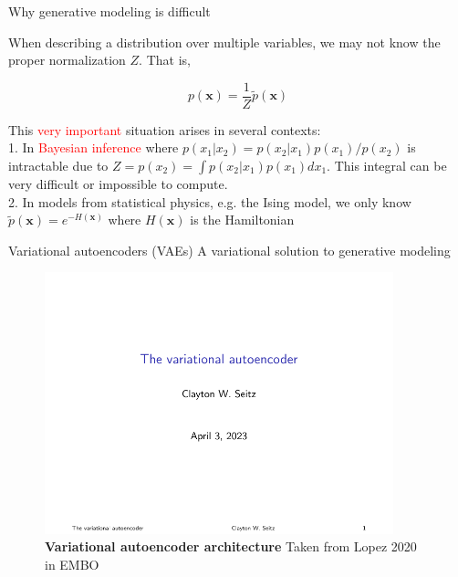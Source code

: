 \documentclass{beamer}					%
\begin{document}
\begin{frame}{Why generative modeling is difficult}

When describing a distribution over multiple variables, we may not know the proper normalization $Z$. That is,

\begin{equation*}
p(\mathbf{x}) = \frac{1}{Z}\tilde{p}(\mathbf{x})
\end{equation*}

\vspace{0.1in}
This \textcolor{red}{very important} situation arises in several contexts:\\
\vspace{0.1in}
1. In \textcolor{red}{Bayesian inference} where $p(x_{1}|x_{2}) = p(x_{2}|x_{1})p(x_{1})/p(x_{2})$ is intractable due to $Z = p(x_{2}) = \int p(x_{2}|x_{1})p(x_{1})dx_{1}$. This integral can be very difficult or impossible to
compute.\\
\vspace{0.1in}
2. In models from statistical physics, e.g. the Ising model, we only know
$\tilde{p}(\mathbf{x}) = e^{−H(\mathbf{x})}$ where $H(\mathbf{x})$ is the Hamiltonian

\end{frame}

\begin{frame}{Variational autoencoders (VAEs)}
A variational solution to generative modeling

\begin{center}
\begin{figure}
\includegraphics[width=0.9\textwidth]{vae}
\caption{\textbf{Variational autoencoder architecture} Taken from Lopez 2020 in EMBO}
\end{figure}
\end{center}
\end{frame}
\end{document}
